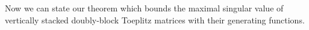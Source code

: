 Now we can state our theorem which bounds the maximal singular value of vertically stacked doubly-block Toeplitz matrices with their generating functions. 






